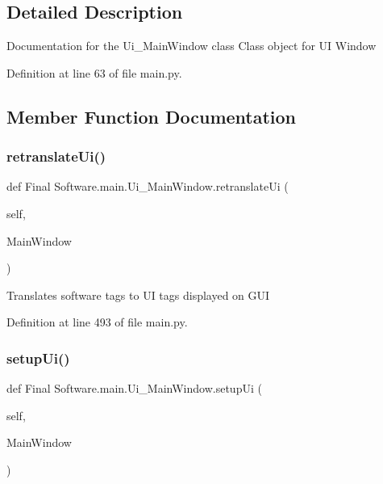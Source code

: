 \subsection{Detailed Description}
\begin{DoxyVerb}Documentation for the Ui_MainWindow class
Class object for UI Window\end{DoxyVerb}
 

Definition at line 63 of file main.\+py.



\subsection{Member Function Documentation}
\mbox{\label{class_final_01_software_1_1main_1_1_ui___main_window_ab29399a0a14298ddd6f88aad209ad7d5}} 
\subsubsection{retranslateUi()}
{\footnotesize\ttfamily def Final Software.\+main.\+Ui\+\_\+\+Main\+Window.\+retranslate\+Ui (\begin{DoxyParamCaption}\item[{}]{self,  }\item[{}]{Main\+Window }\end{DoxyParamCaption})}

\begin{DoxyVerb}Translates software tags to UI tags displayed on GUI
\end{DoxyVerb}
 

Definition at line 493 of file main.\+py.

\mbox{\label{class_final_01_software_1_1main_1_1_ui___main_window_a529eac74bc2c02fb9faf224d64bd0a51}} 
\subsubsection{setupUi()}
{\footnotesize\ttfamily def Final Software.\+main.\+Ui\+\_\+\+Main\+Window.\+setup\+Ui (\begin{DoxyParamCaption}\item[{}]{self,  }\item[{}]{Main\+Window }\end{DoxyParamCaption})}

